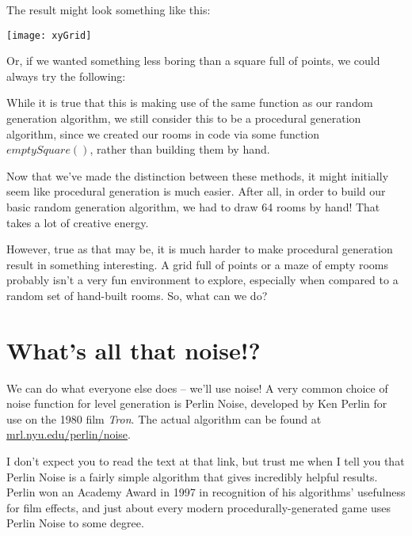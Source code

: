 \documentclass[12pt,twoside]{reedthesis}
\begin{document}
The result might look something like this:

\texttt{[image: xyGrid]}

Or, if we wanted something less boring than a square full of points, we could always try the following:
\begin{algorithm}
\end{algorithm}

While it is true that this is making use of the same function as our random generation algorithm, we still consider this to be a procedural generation algorithm, since we created our rooms in code via some function $emptySquare()$, rather than building them by hand.

Now that we've made the distinction between these methods, it might initially seem like procedural generation is much easier.
After all, in order to build our basic random generation algorithm, we had to draw 64 rooms by hand! That takes a lot of creative energy.

However, true as that may be, it is much harder to make procedural generation result in something interesting. A grid full of points or a maze of empty rooms probably isn't a very fun environment to explore, especially when compared to a random set of hand-built rooms. So, what can we do?

\section{What's all that noise!?}
We can do what everyone else does -- we'll use noise!
A very common choice of noise function for level generation is Perlin Noise, developed by Ken Perlin for use on the 1980 film \textit{Tron}.
The actual algorithm can be found at \href{https://mrl.nyu.edu/perlin/noise}{mrl.nyu.edu/perlin/noise}.

I don't expect you to read the text at that link, but trust me when I tell you that Perlin Noise is a fairly simple algorithm that gives incredibly helpful results. Perlin won an Academy Award in 1997 in recognition of his algorithms' usefulness for film effects, and just about every modern procedurally-generated game uses Perlin Noise to some degree.
\end{document}
